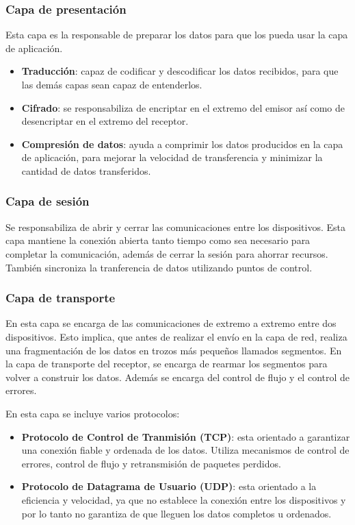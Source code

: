 \subsubsection{Capa de presentación}
\label{subsubsec:capa_presentacion}
Esta capa es la responsable de preparar los datos para que los pueda usar la capa de aplicación.
\begin{itemize}
    \item \textbf{Traducción}: capaz de codificar y descodificar los datos recibidos, para que las demás capas sean capaz de entenderlos.
    \item \textbf{Cifrado}: se responsabiliza de encriptar en el extremo del emisor así como de desencriptar en el extremo del receptor.
    \item \textbf{Compresión de datos}: ayuda a comprimir los datos producidos en la capa de aplicación, para mejorar la velocidad de transferencia y minimizar la cantidad de datos transferidos.
\end{itemize}

\subsubsection{Capa de sesión}
\label{subsubsec:capa_sesion}
Se responsabiliza de abrir y cerrar las comunicaciones entre los dispositivos. Esta capa mantiene la conexión abierta tanto tiempo como sea necesario para completar la comunicación, además de cerrar la sesión para ahorrar recursos. También sincroniza la tranferencia de datos utilizando puntos de control.

\subsubsection{Capa de transporte}
\label{subsubsec:capa_transporte}
En esta capa se encarga de las comunicaciones de extremo a extremo entre dos dispositivos. Esto implica, que antes de realizar el envío en la capa de red, realiza una fragmentación de los datos en trozos más pequeños llamados segmentos. En la capa de transporte del receptor, se encarga de rearmar los segmentos para volver a construir los datos. Además se encarga del control de flujo y el control de errores.

En esta capa se incluye varios protocolos:
\begin{itemize}
    \item \textbf{Protocolo de Control de Tranmisión (TCP)}: esta orientado a garantizar una conexión fiable y ordenada de los datos. Utiliza mecanismos de control de errores, control de flujo y retransmisión de paquetes perdidos.
    \item \textbf{Protocolo de Datagrama de Usuario (UDP)}: esta orientado a la eficiencia y velocidad, ya que no establece la conexión entre los dispositivos y por lo tanto no garantiza de que lleguen los datos completos u ordenados.
\end{itemize}

